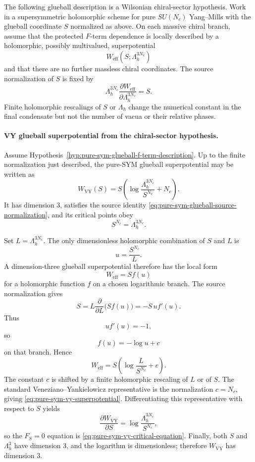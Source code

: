 \begin{hypothesis}
\label{hyp:pure-sym-glueball-f-term-description}
The following glueball description is a Wilsonian chiral-sector hypothesis.
Work in a supersymmetric holomorphic scheme for pure \(SU(N_c)\)
Yang--Mills with the glueball coordinate \(S\) normalized as above.  On each
massive chiral branch, assume that the protected \(F\)-term dependence is
locally described by a holomorphic, possibly multivalued, superpotential
\[
  W_{\mathrm{eff}}(S;\Lambda_h^{3N_c})
\]
and that there are no further massless chiral coordinates.  The source
normalization of \(S\) is fixed by
\begin{equation}
  \Lambda_h^{3N_c}
  \frac{\partial W_{\mathrm{eff}}}{\partial \Lambda_h^{3N_c}}
  =
  S .
  \label{eq:pure-sym-glueball-source-normalization}
\end{equation}
Finite holomorphic rescalings of \(S\) or \(\Lambda_h\) change the numerical
constant in the final condensate but not the number of vacua or their
relative phases.
\end{hypothesis}

\paragraph{VY glueball superpotential from the chiral-sector hypothesis.}
Assume Hypothesis~\ref{hyp:pure-sym-glueball-f-term-description}.  Up to the
finite normalization just described, the pure-SYM glueball superpotential may
be written as
\begin{equation}
  W_{\mathrm{VY}}(S)
  =
  S\left(
    \log\frac{\Lambda_h^{3N_c}}{S^{N_c}}+N_c
  \right).
  \label{eq:pure-sym-vy-superpotential}
\end{equation}
It has dimension \(3\), satisfies the source identity
\eqref{eq:pure-sym-glueball-source-normalization}, and its critical points
obey
\begin{equation}
  S^{N_c}=\Lambda_h^{3N_c}.
  \label{eq:pure-sym-vy-critical-equation}
\end{equation}

Set \(L=\Lambda_h^{3N_c}\).  The only dimensionless holomorphic combination
of \(S\) and \(L\) is
\[
  u=\frac{S^{N_c}}{L}.
\]
A dimension-three glueball superpotential therefore has the local form
\[
  W_{\mathrm{eff}}=S f(u)
\]
for a holomorphic function \(f\) on a chosen logarithmic branch.  The source
normalization gives
\[
  S
  =
  L\frac{\partial}{\partial L}\bigl(Sf(u)\bigr)
  =
  -S\,u f'(u).
\]
Thus
\[
  u f'(u)=-1,
\]
so
\[
  f(u)=-\log u+c
\]
on that branch.  Hence
\[
  W_{\mathrm{eff}}
  =
  S\left(\log\frac{L}{S^{N_c}}+c\right).
\]
The constant \(c\) is shifted by a finite holomorphic rescaling of \(L\) or
of \(S\).  The standard Veneziano--Yankielowicz representative is the
normalization \(c=N_c\), giving
\eqref{eq:pure-sym-vy-superpotential}.  Differentiating this representative
with respect to \(S\) yields
\[
  \frac{\partial W_{\mathrm{VY}}}{\partial S}
  =
  \log\frac{\Lambda_h^{3N_c}}{S^{N_c}},
\]
so the \(F_S=0\) equation is
\eqref{eq:pure-sym-vy-critical-equation}.  Finally, both \(S\) and
\(\Lambda_h^3\) have dimension \(3\), and the logarithm is dimensionless;
therefore \(W_{\mathrm{VY}}\) has dimension \(3\).

